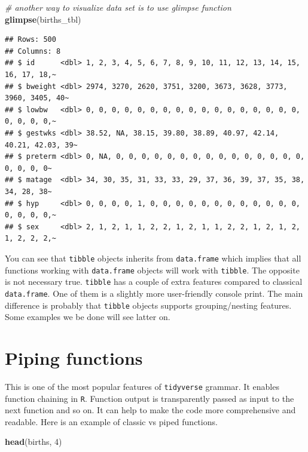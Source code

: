 \documentclass[
]{book}
\newenvironment{Shaded}{\begin{snugshade}}{\end{snugshade}}
\newcommand{\CommentTok}[1]{\textcolor[rgb]{0.56,0.35,0.01}{\textit{#1}}}
\newcommand{\DecValTok}[1]{\textcolor[rgb]{0.00,0.00,0.81}{#1}}
\newcommand{\FunctionTok}[1]{\textcolor[rgb]{0.13,0.29,0.53}{\textbf{#1}}}
\newcommand{\NormalTok}[1]{#1}
\begin{document}
\begin{Shaded}
\begin{Highlighting}[]
\CommentTok{\# another way to visualize data set is to use glimpse function}
\FunctionTok{glimpse}\NormalTok{(births\_tbl)}
\end{Highlighting}
\end{Shaded}

\begin{verbatim}
## Rows: 500
## Columns: 8
## $ id      <dbl> 1, 2, 3, 4, 5, 6, 7, 8, 9, 10, 11, 12, 13, 14, 15, 16, 17, 18,~
## $ bweight <dbl> 2974, 3270, 2620, 3751, 3200, 3673, 3628, 3773, 3960, 3405, 40~
## $ lowbw   <dbl> 0, 0, 0, 0, 0, 0, 0, 0, 0, 0, 0, 0, 0, 0, 0, 0, 0, 0, 0, 0, 0,~
## $ gestwks <dbl> 38.52, NA, 38.15, 39.80, 38.89, 40.97, 42.14, 40.21, 42.03, 39~
## $ preterm <dbl> 0, NA, 0, 0, 0, 0, 0, 0, 0, 0, 0, 0, 0, 0, 0, 0, 0, 0, 0, 0, 0~
## $ matage  <dbl> 34, 30, 35, 31, 33, 33, 29, 37, 36, 39, 37, 35, 38, 34, 28, 38~
## $ hyp     <dbl> 0, 0, 0, 0, 1, 0, 0, 0, 0, 0, 0, 0, 0, 0, 0, 0, 0, 0, 0, 0, 0,~
## $ sex     <dbl> 2, 1, 2, 1, 1, 2, 2, 1, 2, 1, 1, 2, 2, 1, 2, 1, 2, 1, 2, 2, 2,~
\end{verbatim}

You can see that \texttt{tibble} objects inherits from \texttt{data.frame} which implies that all functions
working with \texttt{data.frame} objects will work with \texttt{tibble}. The opposite is
not necessary true. \texttt{tibble} has a couple of extra features compared to classical
\texttt{data.frame}. One of them is a slightly more user-friendly console print. The main
difference is probably that \texttt{tibble} objects supports grouping/nesting features.
Some examples we be done will see latter on.

\section{Piping functions}\label{piping-functions}

This is one of the most popular features of \texttt{tidyverse} grammar. It enables function chaining in
\texttt{R}. Function output is transparently passed as input to the next function and so on.
It can help to make the code more comprehensive and readable.
Here is an example of classic vs piped functions.

\begin{Shaded}
\begin{Highlighting}[]
\FunctionTok{head}\NormalTok{(births, }\DecValTok{4}\NormalTok{)}
\end{Highlighting}
\end{Shaded}
\end{document}

